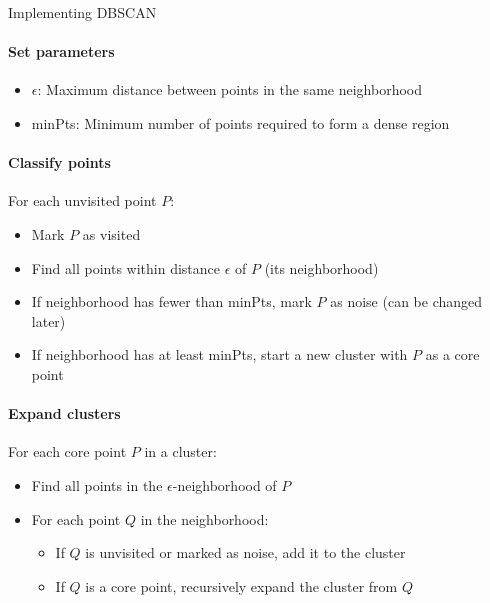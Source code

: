 \begin{KR}{Implementing DBSCAN}\\
\paragraph{Set parameters}
\begin{itemize}
    \item $\epsilon$: Maximum distance between points in the same neighborhood
    \item minPts: Minimum number of points required to form a dense region
\end{itemize}

\paragraph{Classify points}
For each unvisited point $P$:
\begin{itemize}
    \item Mark $P$ as visited
    \item Find all points within distance $\epsilon$ of $P$ (its neighborhood)
    \item If neighborhood has fewer than minPts, mark $P$ as noise (can be changed later)
    \item If neighborhood has at least minPts, start a new cluster with $P$ as a core point
\end{itemize}

\paragraph{Expand clusters}
For each core point $P$ in a cluster:
\begin{itemize}
    \item Find all points in the $\epsilon$-neighborhood of $P$
    \item For each point $Q$ in the neighborhood:
    \begin{itemize}
        \item If $Q$ is unvisited or marked as noise, add it to the cluster
        \item If $Q$ is a core point, recursively expand the cluster from $Q$
    \end{itemize}
\end{itemize}
\end{KR}

